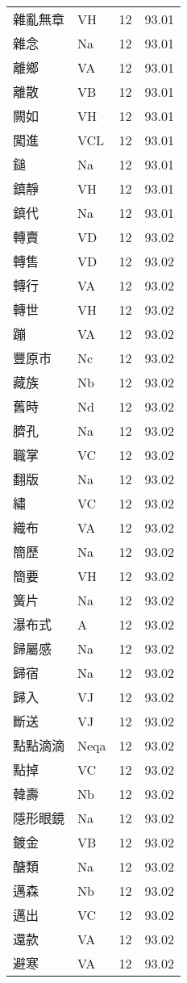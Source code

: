 \documentclass[twocolumn]{book}
\begin{document}
\begin{supertabular}{llrr}
雜亂無章 & VH & 12 &  93.01\\
雜念 & Na & 12 &  93.01\\
離鄉 & VA & 12 &  93.01\\
離散 & VB & 12 &  93.01\\
闕如 & VH & 12 &  93.01\\
闖進 & VCL & 12 &  93.01\\
鎚 & Na & 12 &  93.01\\
鎮靜 & VH & 12 &  93.01\\
鎮代 & Na & 12 &  93.01\\
轉賣 & VD & 12 &  93.02\\
轉售 & VD & 12 &  93.02\\
轉行 & VA & 12 &  93.02\\
轉世 & VH & 12 &  93.02\\
蹦 & VA & 12 &  93.02\\
豐原市 & Nc & 12 &  93.02\\
藏族 & Nb & 12 &  93.02\\
舊時 & Nd & 12 &  93.02\\
臍孔 & Na & 12 &  93.02\\
職掌 & VC & 12 &  93.02\\
翻版 & Na & 12 &  93.02\\
繡 & VC & 12 &  93.02\\
織布 & VA & 12 &  93.02\\
簡歷 & Na & 12 &  93.02\\
簡要 & VH & 12 &  93.02\\
簧片 & Na & 12 &  93.02\\
瀑布式 & A & 12 &  93.02\\
歸屬感 & Na & 12 &  93.02\\
歸宿 & Na & 12 &  93.02\\
歸入 & VJ & 12 &  93.02\\
斷送 & VJ & 12 &  93.02\\
點點滴滴 & Neqa & 12 &  93.02\\
點掉 & VC & 12 &  93.02\\
韓壽 & Nb & 12 &  93.02\\
隱形眼鏡 & Na & 12 &  93.02\\
鍍金 & VB & 12 &  93.02\\
醣類 & Na & 12 &  93.02\\
邁森 & Nb & 12 &  93.02\\
邁出 & VC & 12 &  93.02\\
還款 & VA & 12 &  93.02\\
避寒 & VA & 12 &  93.02\\

\end{supertabular}
\end{document}
